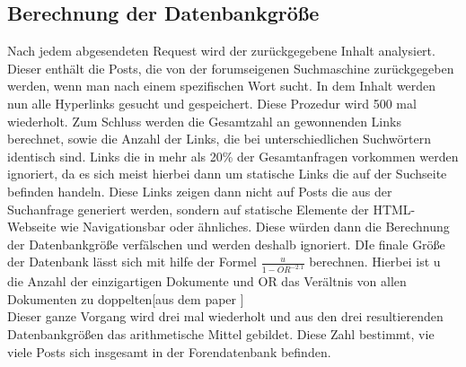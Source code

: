 \subsection{Berechnung der Datenbankgröße}
Nach jedem abgesendeten Request wird der zurückgegebene Inhalt analysiert. Dieser enthält die Posts, die von der 
forumseigenen Suchmaschine zurückgegeben werden, wenn man nach einem spezifischen Wort sucht. In dem Inhalt werden nun alle Hyperlinks gesucht und gespeichert. Diese Prozedur wird 500 mal wiederholt. Zum Schluss werden die Gesamtzahl an gewonnenden Links berechnet, sowie die Anzahl der Links, die bei unterschiedlichen Suchwörtern identisch sind. Links die in mehr als 20\% der Gesamtanfragen vorkommen werden ignoriert, da es sich meist hierbei dann um statische Links die auf der Suchseite befinden handeln. Diese Links zeigen dann nicht auf Posts die aus der Suchanfrage generiert werden, sondern auf statische Elemente der HTML-Webseite wie Navigationsbar oder ähnliches. Diese würden dann die Berechnung der Datenbankgröße verfälschen und werden deshalb ignoriert.
DIe finale Größe der Datenbank lässt sich mit hilfe der Formel \(\frac{u}{1-OR^{-2.1}}\) berechnen. Hierbei ist u die Anzahl der einzigartigen Dokumente und OR das Verältnis von allen Dokumenten zu doppelten[aus dem paper ]\\
Dieser ganze Vorgang wird drei mal wiederholt und aus den drei resultierenden Datenbankgrößen das arithmetische Mittel gebildet. Diese Zahl bestimmt, vie viele Posts sich insgesamt in der Forendatenbank befinden.

\newpage
